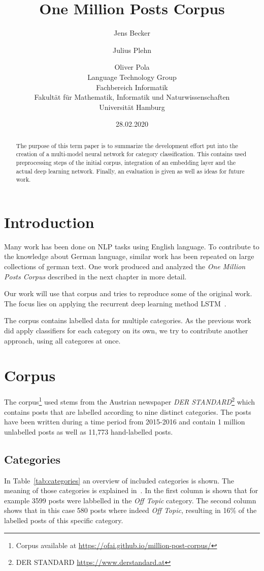 \documentclass[11pt,a4paper]{article}
\title{One Million Posts Corpus}
\author{Jens Becker \and Julius Plehn \and Oliver Pola \\ 
	Language Technology Group \\
	Fachbereich Informatik \\
	Fakultät für Mathematik, Informatik und Naturwissenschaften \\
	Universität Hamburg
}
\date{28.02.2020}
\begin{document}
\maketitle
\begin{abstract}
The purpose of this term paper is to summarize the development effort put into the creation of a multi-model neural network for category classification. This contains used preprocessing steps of the initial corpus, integration of an embedding layer and the actual deep learning network. Finally, an evaluation is given as well as ideas for future work. 

 
\end{abstract}

\section{Introduction}

Many work has been done on NLP tasks using English language.
To contribute to the knowledge about German language, similar work has been repeated on large collections of german text.
One work produced and analyzed the \textit{One Million Posts Corpus} described in the next chapter in more detail.~\cite{Schabus17, Schabus18}

Our work will use that corpus and tries to reproduce some of the original work.
The focus lies on applying the recurrent deep learning method LSTM~\cite{lstm}.

The corpus contains labelled data for multiple categories.
As the previous work did apply classifiers for each category on its own, we try to contribute another approach, using all categores at once.


\section{Corpus}
The corpus\footnote{Corpus available at \url{https://ofai.github.io/million-post-corpus/}} used stems from the Austrian newspaper \textit{DER STANDARD}\footnote{DER STANDARD \url{https://www.derstandard.at}} which contains posts that are labelled according to nine distinct categories. The posts have been written during a time period from 2015-2016 and contain 1 million unlabelled posts as well as 11,773 hand-labelled posts.


\subsection{Categories}
In Table~\ref{tab:categories} an overview of included categories is shown. The meaning of those categories is explained in~\cite{Schabus17}. 
In the first column is shown that for example 3599 posts were labbelled in the \textit{Off Topic} category. 
The second column shows that in this case 580 posts where indeed \textit{Off Topic}, resulting in 16\% of the labelled posts of this specific category. 
\end{document}
